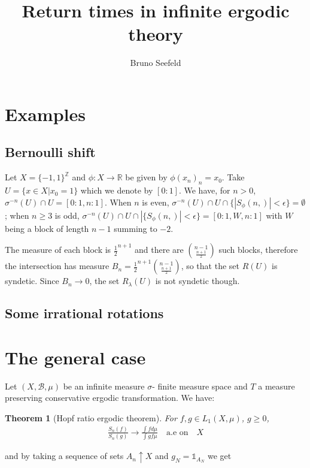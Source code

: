 \documentclass{article}
\title{Return times in infinite ergodic theory}
\author{Bruno Seefeld}
\newtheorem{theorem}{Theorem}[section]
\begin{document}
\maketitle


\section{Examples}

\subsection{Bernoulli shift}
Let $X=\{-1,1\}^\mathbb{Z}$ and $\phi:X\to \mathbb{R}$ be given by 
$\phi(x_n)_n=x_0$. Take $U=\{x\in X| x_0=1\}$ which we denote by $[0:1]$.
We have, for $n>0$, $\sigma^{-n}(U)\cap U=[0:1, n:1]$. When $n$ is even,
$\sigma^{-n}(U)\cap U\cap \{|S_\phi(n,)|<\epsilon\}=\emptyset$; when
$n\geq 3$ is odd, 
$\sigma^{-n}(U)\cap U\cap |\{S_\phi(n,)|<\epsilon\}=[0:1, W, n:1]$
with $W$ being a block of length $n-1$ summing to $-2$. 

The measure of each block is $\frac{1}{2}^{n+1}$ and there are 
${n-1\choose \frac{n+1}{2}}$ such blocks, therefore the intersection
has measure  $B_n=\frac{1}{2}^{n+1} {n-1\choose \frac{n+1}{2}}$, so
that the set $R(U)$ is syndetic. Since $B_n\to 0$, the set $R_\lambda(U)$
is not syndetic though.


\subsection{Some irrational rotations}



\section{The general case}

Let $(X,\mathcal{B},\mu)$ be an infinite measure $\sigma$-
finite measure space and $T$ a measure preserving conservative ergodic
transformation. We have: 

\begin{theorem}[Hopf ratio ergodic theorem]
For $f,g\in L_1(X,\mu)$, $g\geq 0$,
\begin{align*}
    \frac{S_n(f)}{S_n(g)}\to \frac{\int f d\mu}{\int g f\mu} \quad \text{a.e on} \quad X
\end{align*}
\end{theorem}

and by taking a sequence of sets $A_n\uparrow X$ and $g_N=\mathds{1}_{A_N}$
we get 
\end{document}
